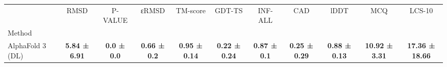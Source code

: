 \begin{tabular}{lcccccccccc}
\toprule
 & RMSD & P-VALUE & εRMSD & TM-score & GDT-TS & INF-ALL & CAD & lDDT & MCQ & LCS-10 \\
Method &  &  &  &  &  &  &  &  &  &  \\
\midrule
AlphaFold 3 (DL) & \textbf{5.84 ± 6.91} & \textbf{0.0 ± 0.0} & \textbf{0.66 ± 0.2} & \textbf{0.95 ± 0.14} & \textbf{0.22 ± 0.24} & \textbf{0.87 ± 0.1} & \textbf{0.25 ± 0.29} & \textbf{0.88 ± 0.13} & \textbf{10.92 ± 3.31} & \textbf{17.36 ± 18.66} \\
\bottomrule
\end{tabular}
